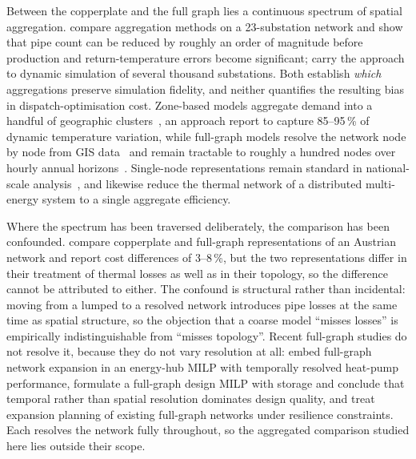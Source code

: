 Between the copperplate and the full graph lies a continuous spectrum of spatial
aggregation. \citet{Larsen2004} compare aggregation methods on a 23-substation network
and show that pipe count can be reduced by roughly an order of magnitude before
production and return-temperature errors become significant; \citet{Falay2020} carry the
approach to dynamic simulation of several thousand substations. Both establish
\emph{which} aggregations preserve simulation fidelity, and neither quantifies the
resulting bias in dispatch-optimisation cost. Zone-based models aggregate demand into a
handful of geographic clusters~\cite{Wirtz2020}, an approach \citet{Buenning2020} report
to capture 85--95\,\% of dynamic temperature variation, while full-graph models resolve
the network node by node from GIS data~\cite{vanderHeijde2017} and remain tractable to
roughly a hundred nodes over hourly annual horizons~\cite{Giraud2015}. Single-node
representations remain standard in national-scale
analysis~\cite{Connolly2014_EnergyPLAN}, and \citet{Gabrielli2018} likewise reduce the
thermal network of a distributed multi-energy system to a single aggregate efficiency.

Where the spectrum has been traversed deliberately, the comparison has been confounded.
\citet{Leitner2019} compare copperplate and full-graph representations of an Austrian
network and report cost differences of 3--8\,\%, but the two representations differ in
their treatment of thermal losses as well as in their topology, so the difference cannot
be attributed to either. The confound is structural rather than incidental: moving from a
lumped to a resolved network introduces pipe losses at the same time as spatial
structure, so the objection that a coarse model ``misses losses'' is empirically
indistinguishable from ``misses topology''. Recent full-graph studies do not resolve it,
because they do not vary resolution at all: \citet{Trentmann2026} embed full-graph
network expansion in an energy-hub MILP with temporally resolved heat-pump performance,
\citet{Ceruti2025} formulate a full-graph design MILP with storage and conclude that
temporal rather than spatial resolution dominates design quality, and
\citet{Vieth2026} treat expansion planning of existing full-graph networks under
resilience constraints. Each resolves the network fully throughout, so the aggregated
comparison studied here lies outside their scope.

